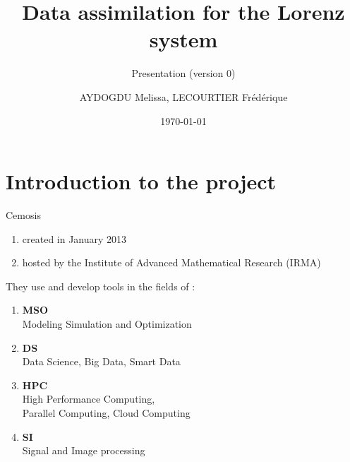 \documentclass[10pt,xcolor={table,dvipsnames},t]{beamer}
\title[Lorenz]{Data assimilation for the Lorenz system}
\subtitle{Presentation (version 0)}
\author[name]{AYDOGDU Melissa, LECOURTIER Frédérique}
\institute{\large Strasbourg University}
\date{\today}
\begin{document}
	
	\begin{frame}
		\titlepage
	\end{frame}
	
	\AtBeginSection[]{
		\begin{frame}
			\vfill
			\centering
			\begin{beamercolorbox}[sep=5pt,shadow=true,rounded=true]{subtitle}
				\usebeamerfont{title}\insertsectionhead\par%
			\end{beamercolorbox}
			\vfill
		\end{frame}
	}


	\section{Introduction to the project}

	\begin{frame}{Cemosis}
		
		\begin{minipage}{0.4\hsize}
			\centering
			\begin{enumerate}[$\rightarrow$]
				\item created in January 2013
				\item hosted by the Institute of Advanced Mathematical Research (IRMA)
			\end{enumerate}
		\end{minipage} \quad
		\begin{minipage}{0.5\hsize}
			They use and develop tools in the fields of : 
			\begin{enumerate}[\textbullet]
				\item \textbf{MSO} \\
				Modeling Simulation and Optimization
				\item \textbf{DS} \\
				Data Science, Big Data, Smart Data
				\item \textbf{HPC} \\
				High Performance Computing, \\
				Parallel Computing, Cloud Computing
				\item \textbf{SI} \\
				Signal and Image processing
			\end{enumerate}
		\end{minipage}
	
	\end{frame}
\end{document}
